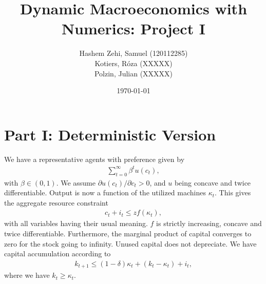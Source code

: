 \documentclass[a4paper]{article}
\title{Dynamic Macroeconomics with Numerics: Project I}
\author{Hashem Zehi, Samuel (120112285)\\Kotiers, Róza (XXXXX)\\Polzin, Julian (XXXXX)} %
\date{\today}
\theoremstyle{definition}
\begin{document}
\maketitle
\newpage
\section{Part I: Deterministic Version}
We have a representative agents with preference given by
	\begin{align*}
	\sum\limits_{t=0}^{\infty} \beta^t u(c_t),
	\end{align*}
with $\beta \in (0,1)$. We assume $\partial u(c_t)/\partial c_t > 0$, and $u$ being concave and twice differentiable. Output is now a function of the utilized machines $\kappa_t$. This gives the aggregate resource constraint
	\begin{align*}
	c_t + i_t \leq z f(\kappa_t),
	\end{align*}	
with all variables having their usual meaning. $f$ is strictly increasing, concave and twice differentiable. Furthermore, the marginal product of capital converges to zero for the stock going to infinity. Unused capital does not depreciate. We have capital accumulation according to 
	\begin{align*}
	k_{t+1} \leq (1-\delta)\kappa_t + (k_t - \kappa_t)+i_t,
	\end{align*}	
where we have $k_t \geq \kappa_t$. 
\end{document}
